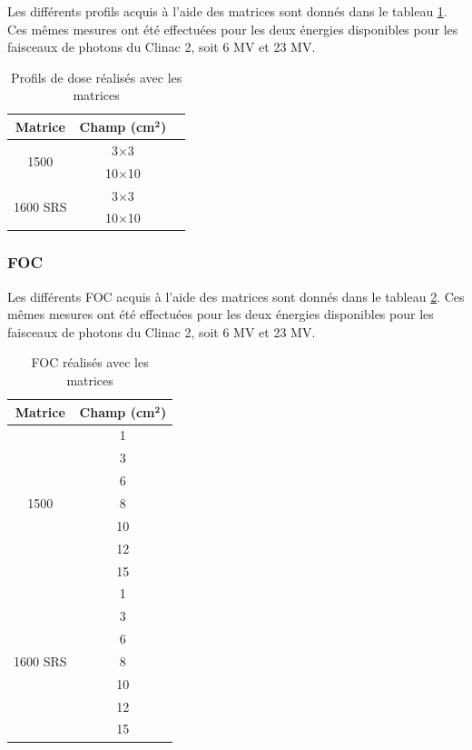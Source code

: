 \documentclass{book}
\begin{document}
Les différents profils acquis à l'aide des matrices sont donnés dans le tableau \ref*{table_profils_matrices}. Ces mêmes mesures ont été effectuées pour les deux énergies disponibles pour les faisceaux de photons du Clinac 2, soit 6 MV et 23 MV.

\begin{table}[h]
  \centering
  \begin{tabular}{ccc}
  \toprule
  \textbf{Matrice} & \textbf{Champ} \textbf{(cm}$\mathbf{^2}$\textbf{)}\\ \toprule
  \multirow{2}{*}{1500} & 3$\times$3 \\
    & 10$\times$10 \\ \hline
  \multirow{2}{*}{1600 SRS} & 3$\times$3 \\
    & 10$\times$10 \\ \bottomrule
  \end{tabular}
  \caption{Profils de dose réalisés avec les matrices}
  \label{table_profils_matrices}
\end{table}

\subsubsection{FOC}

Les différents FOC acquis  à l'aide des matrices sont donnés dans le tableau \ref*{table_foc_matrices}. Ces mêmes mesures ont été effectuées pour les deux énergies disponibles pour les faisceaux de photons du Clinac 2, soit 6 MV et 23 MV.

\begin{table}[h]
  \centering
  \begin{tabular}{cc}
  \toprule
  \textbf{Matrice} & \textbf{Champ (cm}$\mathbf{^2}$\textbf{)}\\ \toprule
  \multirow{7}{*}{1500} & 1 \\
   & 3 \\
   & 6 \\
   & 8 \\
   & 10 \\
   & 12 \\
   & 15 \\ \hline
   \multirow{7}{*}{1600 SRS} & 1 \\
   & 3 \\
   & 6 \\
   & 8 \\
   & 10 \\
   & 12 \\
   & 15 \\ \bottomrule
  \end{tabular}
  \caption{FOC réalisés avec les matrices}
  \label{table_foc_matrices}
\end{table}
\end{document}
